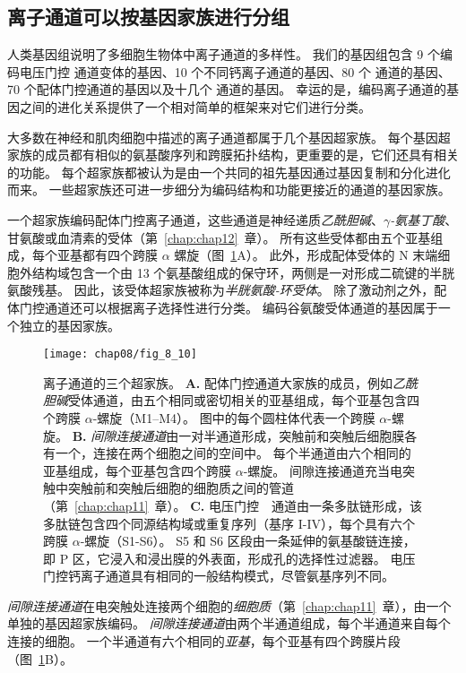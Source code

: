 \subsection{离子通道可以按基因家族进行分组}

人类基因组说明了多细胞生物体中离子通道的多样性。 我们的基因组包含 9 个编码电压门控  通道变体的基因、10 个不同钙离子通道的基因、80 个  通道的基因、70 个配体门控通道的基因以及十几个  通道的基因。
幸运的是，编码离子通道的基因之间的进化关系提供了一个相对简单的框架来对它们进行分类。


大多数在神经和肌肉细胞中描述的离子通道都属于几个基因超家族。
每个基因超家族的成员都有相似的氨基酸序列和跨膜拓扑结构，更重要的是，它们还具有相关的功能。
每个超家族都被认为是由一个共同的祖先基因通过基因复制和分化进化而来。
一些超家族还可进一步细分为编码结构和功能更接近的通道的基因家族。


一个超家族编码配体门控离子通道，这些通道是神经递质\textit{乙酰胆碱}、\textit{$\gamma$-氨基丁酸}、甘氨酸或血清素的受体（第~\ref{chap:chap12}~章）。 
所有这些受体都由五个亚基组成，每个亚基都有四个跨膜 $\alpha$ 螺旋（图~\ref{fig:8_10}A）。 
此外，形成配体受体的 N 末端细胞外结构域包含一个由 13 个氨基酸组成的保守环，两侧是一对形成二硫键的半胱氨酸残基。
因此，该受体超家族被称为\textit{半胱氨酸-环受体}。
除了激动剂之外，配体门控通道还可以根据离子选择性进行分类。
编码谷氨酸受体通道的基因属于一个独立的基因家族。


\begin{figure}[htbp]
	\centering
	\texttt{[image: chap08/fig\_8\_10]}
	\caption{离子通道的三个超家族。 
		\textbf{A.} 配体门控通道大家族的成员，例如\textit{乙酰胆碱}受体通道，由五个相同或密切相关的亚基组成，每个亚基包含四个跨膜 $\alpha$-螺旋（M1–M4）。
		图中的每个圆柱体代表一个跨膜 $\alpha$-螺旋。
		\textbf{B.} \textit{间隙连接通道}由一对半通道形成，突触前和突触后细胞膜各有一个，连接在两个细胞之间的空间中。
		每个半通道由六个相同的亚基组成，每个亚基包含四个跨膜 $\alpha$-螺旋。
		间隙连接通道充当电突触中突触前和突触后细胞的细胞质之间的管道（第~\ref{chap:chap11}~章）。
		\textbf{C.} 电压门控~~通道由一条多肽链形成，该多肽链包含四个同源结构域或重复序列（基序 I-IV），每个具有六个跨膜 $\alpha$-螺旋（S1-S6）。
		S5 和 S6 区段由一条延伸的氨基酸链连接，即 P 区，它浸入和浸出膜的外表面，形成孔的选择性过滤器。
		电压门控钙离子通道具有相同的一般结构模式，尽管氨基序列不同。}
	\label{fig:8_10}
\end{figure}




\textit{间隙连接通道}在电突触处连接两个细胞的\textit{细胞质}（第~\ref{chap:chap11}~章），由一个单独的基因超家族编码。
\textit{间隙连接通道}由两个半通道组成，每个半通道来自每个连接的细胞。
一个半通道有六个相同的\textit{亚基}，每个亚基有四个跨膜片段（图~\ref{fig:8_10}B）。


